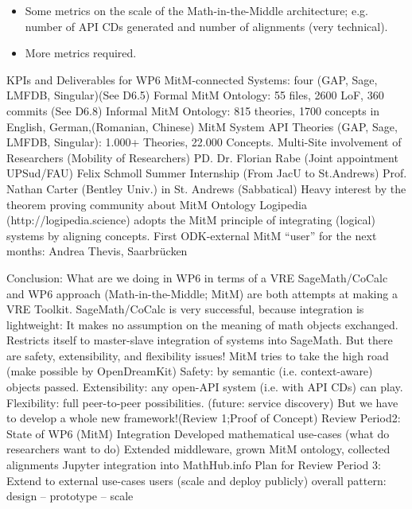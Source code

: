 \begin{Aim 1}
\begin{Aim 2}
\begin{itemize}
\item Some metrics on the scale of the Math-in-the-Middle architecture; e.g. number of API CDs generated and number of
alignments (very technical).
\item More metrics required.
\end{itemize}

KPIs and Deliverables for WP6
MitM-connected Systems: four (GAP, Sage, LMFDB, Singular)(See D6.5)
Formal MitM Ontology: 55 files, 2600 LoF, 360 commits (See D6.8)
Informal MitM Ontology: 815 theories, 1700 concepts in English, German,(Romanian, Chinese)
MitM System API Theories (GAP, Sage, LMFDB, Singular): 1.000+ Theories, 22.000 Concepts.
Multi-Site involvement of Researchers (Mobility of Researchers)
PD. Dr. Florian Rabe (Joint appointment UPSud/FAU)
Felix Schmoll Summer Internship (From JacU to St.Andrews)
Prof. Nathan Carter (Bentley Univ.) in St. Andrews (Sabbatical)
Heavy interest by the theorem proving community about MitM Ontology
Logipedia (http://logipedia.science) adopts the MitM principle of integrating (logical) systems by aligning concepts.
First ODK-external MitM “user” for the next months: Andrea Thevis, Saarbrücken 

Conclusion: What are we doing in WP6 in terms of a VRE
SageMath/CoCalc and WP6 approach (Math-in-the-Middle; MitM) are both attempts at making a VRE Toolkit.
SageMath/CoCalc is very successful, because integration is lightweight:
It makes no assumption on the meaning of math objects exchanged.
Restricts itself to master-slave integration of systems into SageMath.
But there are safety, extensibility, and flexibility issues!
MitM tries to take the high road (make possible by OpenDreamKit)
Safety: by semantic (i.e. context-aware) objects passed.
Extensibility: any open-API system (i.e. with API CDs) can play.
Flexibility: full peer-to-peer possibilities.
(future: service discovery)
But we have to develop a whole new framework!(Review 1;Proof of Concept)
Review Period2: State of WP6 (MitM) Integration
Developed mathematical use-cases (what do researchers want to do)
Extended middleware, grown MitM ontology, collected alignments
Jupyter integration into MathHub.info
Plan for Review Period 3: Extend to external use-cases users  (scale and deploy publicly)
overall pattern: design – prototype – scale


\end{Aim 2}
\end{Aim 1}
